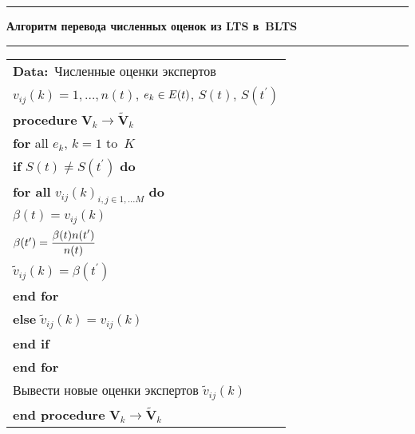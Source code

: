 \begin{multicols}{2}
  \smallskip
  
  
  \begin{center}
  {\small
  \hrule
\vspace*{6pt}

  \textbf{Алгоритм перевода численных оценок из LTS в~BLTS}
  
  \vspace*{6pt}
  
  \hrule
  
  \vspace*{6pt}
  
  \begin{tabular}{l}
    \textbf{Data:}\    Численные оценки экспертов\\
    \hphantom{\textbf{Data:}\ }$v_{ij}(k)=1,\ldots, n(t)$, 
$e_k\hm\in E(t)$, $S(t)$, $S(t^\prime)$\\
        \hspace*{3mm}\textbf{procedure} $\mathbf{V}_k\to 
\tilde{\mathbf{V}}_k$\\
     \hspace{6mm}\textbf{for} all $e_k$, $k=1$ to~$K$\\
          \hspace*{9mm}\textbf{if} $S(t)\not= S(t^\prime)$ \textbf{do}\\
          \hspace*{12mm}\textbf{for all} $v_{ij}(k)_{i,j\in 1,\ldots M}$ \textbf{do}\\
          \hspace*{12mm}$\beta(t)=v_{ij}(k)$\\
          \hspace*{12mm}$\beta(t^\prime)=\displaystyle\frac{\displaystyle \beta(t)n(t^\prime)\mathstrut}{\displaystyle n(t)\mathstrut}$\\
    \hspace*{12mm}$\tilde{v}_{ij}(k)=\beta(t^\prime)$\\
     \hspace*{12mm}\textbf{end for}\\
       \hspace*{9mm}\textbf{else} $\tilde{v}_{ij}(k)=v_{ij}(k)$\\
          \hspace*{9mm}\textbf{end if}\\
          \hspace{6mm}\textbf{end for}\\
       Вывести новые оценки экспертов $\tilde{v}_{ij}(k)$\\
         \textbf{end procedure} $\mathbf{V}_k\to \tilde{\mathbf{V}}_k$
         \end{tabular}
  
}
\end{center}
\end{multicols}
